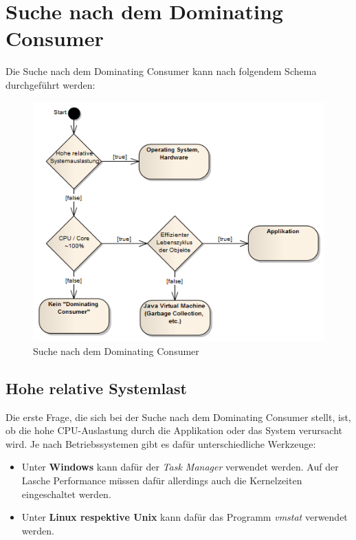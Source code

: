 \section{Suche nach dem Dominating Consumer}\label{dominating_consumer}
Die Suche nach dem Dominating Consumer kann nach folgendem Schema durchgeführt werden:
\begin{figure}[H]
  	\centering
    	\includegraphics[width=13.1cm]{images/dominating_consumer}
        	\caption{Suche nach dem Dominating Consumer}
\end{figure}

\subsection{Hohe relative Systemlast}\label{hohe_systemauslastung}
Die erste Frage, die sich bei der Suche nach dem Dominating Consumer stellt, ist, ob die hohe CPU-Auslastung durch die Applikation oder das System verursacht wird. Je nach Betriebssystemen gibt es dafür unterschiedliche Werkzeuge:
\begin{itemize}
	\item Unter \textbf{Windows} kann dafür der \textit{Task Manager} verwendet werden. Auf der Lasche Performance müssen dafür allerdings auch die Kernelzeiten eingeschaltet werden.
	\item Unter \textbf{Linux respektive Unix} kann dafür das Programm \textit{vmstat} verwendet werden.
\end{itemize}

